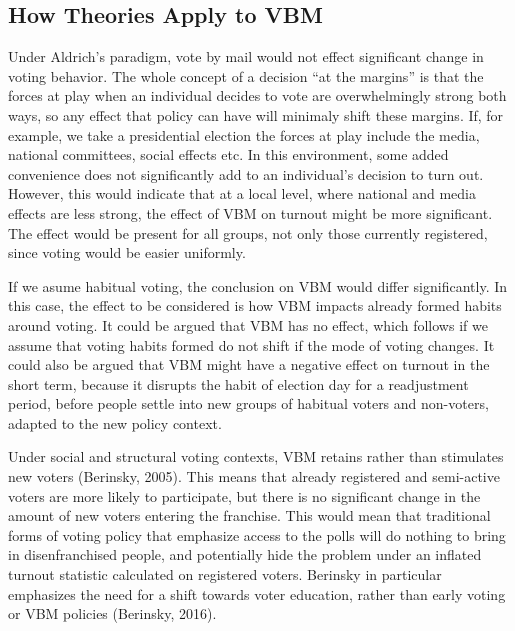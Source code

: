 \documentclass[12pt,twoside]{reedthesis}
\begin{document}
  \subsection{How Theories Apply to VBM}\label{how-theories-apply-to-vbm}
  
  Under Aldrich's paradigm, vote by mail would not effect significant
  change in voting behavior. The whole concept of a decision ``at the
  margins'' is that the forces at play when an individual decides to vote
  are overwhelmingly strong both ways, so any effect that policy can have
  will minimaly shift these margins. If, for example, we take a
  presidential election the forces at play include the media, national
  committees, social effects etc. In this environment, some added
  convenience does not significantly add to an individual's decision to
  turn out. However, this would indicate that at a local level, where
  national and media effects are less strong, the effect of VBM on turnout
  might be more significant. The effect would be present for all groups,
  not only those currently registered, since voting would be easier
  uniformly.
  
  If we asume habitual voting, the conclusion on VBM would differ
  significantly. In this case, the effect to be considered is how VBM
  impacts already formed habits around voting. It could be argued that VBM
  has no effect, which follows if we assume that voting habits formed do
  not shift if the mode of voting changes. It could also be argued that
  VBM might have a negative effect on turnout in the short term, because
  it disrupts the habit of election day for a readjustment period, before
  people settle into new groups of habitual voters and non-voters, adapted
  to the new policy context.
  
  Under social and structural voting contexts, VBM retains rather than
  stimulates new voters (Berinsky, 2005). This means that already
  registered and semi-active voters are more likely to participate, but
  there is no significant change in the amount of new voters entering the
  franchise. This would mean that traditional forms of voting policy that
  emphasize access to the polls will do nothing to bring in
  disenfranchised people, and potentially hide the problem under an
  inflated turnout statistic calculated on registered voters. Berinsky in
  particular emphasizes the need for a shift towards voter education,
  rather than early voting or VBM policies (Berinsky, 2016).
  
\end{document}
